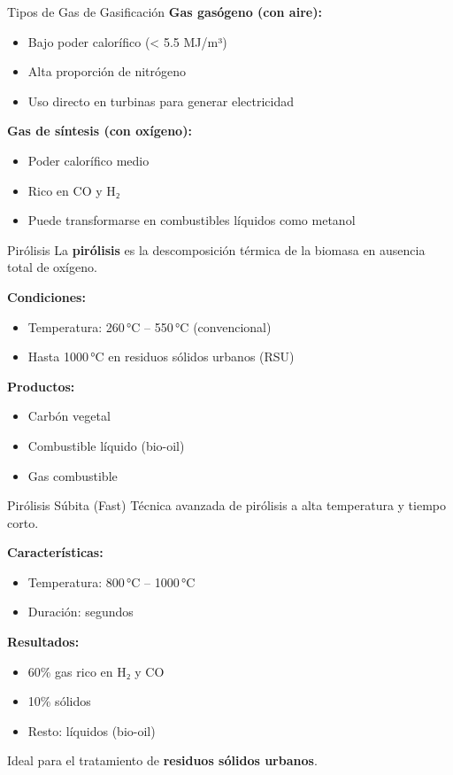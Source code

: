 \documentclass[../../main.tex]{subfiles}
\begin{document}
\begin{frame}{Tipos de Gas de Gasificación}
\justifying
\textbf{Gas gasógeno (con aire):}
\begin{itemize}
  \item Bajo poder calorífico (< 5.5 MJ/m³)
  \item Alta proporción de nitrógeno
  \item Uso directo en turbinas para generar electricidad
\end{itemize}

\textbf{Gas de síntesis (con oxígeno):}
\begin{itemize}
  \item Poder calorífico medio
  \item Rico en CO y H₂
  \item Puede transformarse en combustibles líquidos como metanol
\end{itemize}
\end{frame}
\begin{frame}{Pirólisis}
\justifying
La \textbf{pirólisis} es la descomposición térmica de la biomasa en ausencia total de oxígeno.

\textbf{Condiciones:}
\begin{itemize}
  \item Temperatura: 260 °C – 550 °C (convencional)
  \item Hasta 1000 °C en residuos sólidos urbanos (RSU)
\end{itemize}

\textbf{Productos:}
\begin{itemize}
  \item Carbón vegetal
  \item Combustible líquido (bio-oil)
  \item Gas combustible
\end{itemize}
\end{frame}
\begin{frame}{Pirólisis Súbita (Fast)}
\justifying
Técnica avanzada de pirólisis a alta temperatura y tiempo corto.

\textbf{Características:}
\begin{itemize}
  \item Temperatura: 800 °C – 1000 °C
  \item Duración: segundos
\end{itemize}

\textbf{Resultados:}
\begin{itemize}
  \item 60\% gas rico en H₂ y CO
  \item 10\% sólidos
  \item Resto: líquidos (bio-oil)
\end{itemize}

\vspace{0.5em}
Ideal para el tratamiento de \textbf{residuos sólidos urbanos}.
\end{frame}
\end{document}
